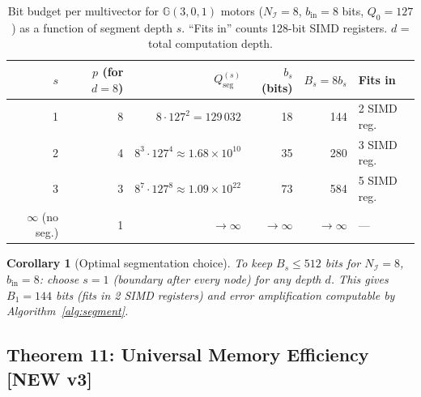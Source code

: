 \documentclass[11pt,a4paper]{article}
\theoremstyle{definition}
\theoremstyle{plain}
\newtheorem{corollary}{Corollary}[section]
\theoremstyle{remark}
\newcommand{\GA}{\mathbb{G}}
\begin{document}
\begin{table}[h]
\centering
\caption{Bit budget per multivector for $\GA(3,0,1)$ motors
($N_\mathcal{I}=8$, $b_\mathrm{in}=8$ bits, $Q_0=127$) as a function
of segment depth $s$.
``Fits in'' counts 128-bit SIMD registers.
$d$ = total computation depth.}
\label{tab:budget-depth}
\small
\begin{tabular}{rrrrrl}
\toprule
$s$ & $p$ (for $d=8$) & $Q^{(s)}_\mathrm{seg}$ & $b_s$ (bits) & $B_s=8b_s$ & Fits in \\
\midrule
1 & 8 & $8\cdot 127^2=129\,032$ & 18 & 144 & 2 SIMD reg. \\
2 & 4 & $8^3\cdot 127^4\approx 1.68\times10^{10}$ & 35 & 280 & 3 SIMD reg. \\
3 & 3 & $8^7\cdot 127^8\approx 1.09\times10^{22}$ & 73 & 584 & 5 SIMD reg. \\
$\infty$ (no seg.) & 1 & $\to\infty$ & $\to\infty$ & $\to\infty$ & --- \\
\bottomrule
\end{tabular}
\end{table}

\begin{corollary}[Optimal segmentation choice]
\label{cor:opt-seg}
To keep $B_s\le 512$ bits for $N_\mathcal{I}=8$, $b_\mathrm{in}=8$:
choose $s=1$ (boundary after every node) for any depth $d$.
This gives $B_1=144$ bits (fits in 2 SIMD registers) and
error amplification computable by Algorithm~\ref{alg:segment}.
\end{corollary}

\subsection{Theorem 11: Universal Memory Efficiency [NEW v3]}
\label{sec:memeff}
\end{document}
